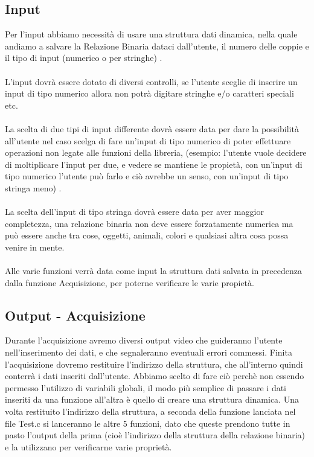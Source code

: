 \documentclass[11pt, a4paper, titlepage, block]{article}
\begin{document}
	\subsection{Input}
	
	
	Per l'input abbiamo necessit\`a di usare una struttura dati dinamica, nella quale andiamo a salvare la Relazione Binaria dataci dall'utente, il numero delle coppie e il tipo di input (numerico o per stringhe) .\\
	\\
	L'input dovr\`a essere dotato di diversi controlli, se l'utente sceglie di inserire un input di tipo numerico allora non potr\`a digitare stringhe e/o caratteri speciali etc.\\
	\\
	La scelta di due tipi di input differente dovr\`a essere data per dare la possibilit\`a all'utente nel caso scelga di fare un'input di tipo numerico di poter effettuare operazioni non legate alle funzioni della libreria, (esempio: l'utente vuole decidere di moltiplicare l'input per due, e vedere se mantiene le propiet\`a, con un'input di tipo numerico l'utente pu\`o farlo e ci\`o avrebbe un senso, con un'input di tipo stringa meno) .\\
	\\
	La scelta dell'input di tipo stringa dovr\`a essere data per aver maggior completezza, una relazione binaria non deve essere forzatamente numerica ma pu\`o essere anche tra cose, oggetti, animali, colori e qualsiasi altra cosa possa venire in mente.\\
	\\
	Alle varie funzioni verr\`a data come input la struttura dati salvata in precedenza dalla funzione Acquisizione, per poterne verificare le varie propiet\`a.\\
	
	
	
	
	\newpage 
	\subsection{Output - Acquisizione}
	Durante l'acquisizione avremo diversi output video che guideranno l'utente nell'inserimento dei dati, e che segnaleranno eventuali errori commessi.
	Finita l'acquisizione dovremo restituire l'indirizzo della struttura, che all'interno quindi conterr\`a i dati inseriti dall'utente. Abbiamo scelto di fare ci\`o perch\`e non essendo permesso l'utilizzo di variabili globali, il modo pi\`u semplice di passare i dati inseriti da una funzione all'altra \`e quello di creare una struttura dinamica.
	Una volta restituito l'indirizzo della struttura, a seconda della funzione lanciata nel file Test.c si lanceranno le altre 5 funzioni, dato che queste prendono tutte in pasto l'output della prima (cio\`e l'indirizzo della struttura della relazione binaria) e la utilizzano per verificarne varie propriet\`a.\\
	\\
\end{document}
